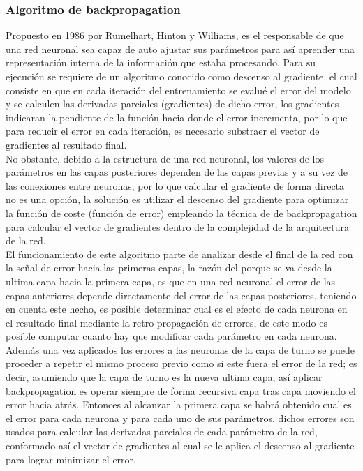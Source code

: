 \subsubsection{Algoritmo de backpropagation}
Propuesto en 1986 por  Rumelhart, Hinton y Williams, es el responsable de que una red neuronal sea capaz de auto ajustar sus parámetros para así aprender una representación interna de la información que estaba procesando. Para su ejecución se requiere de un algoritmo conocido como descenso al gradiente, el cual consiste en que en cada iteración del entrenamiento se evalué el error del modelo y se calculen las derivadas parciales (gradientes) de dicho error, los gradientes indicaran la pendiente de la función hacia donde el error incrementa, por lo que para reducir el error en cada iteración, es necesario substraer el vector de gradientes al resultado final. 
\\
No obstante, debido a la estructura de una red neuronal, los valores de los parámetros en las capas posteriores dependen de las capas previas y a su vez de las conexiones entre neuronas, por lo que calcular el gradiente de forma directa no es una opción, la solución es utilizar el descenso del gradiente para optimizar la función de coste (función de error) empleando la técnica de de backpropagation para calcular el vector de gradientes dentro de la complejidad de la arquitectura de la red. 
\\
El funcionamiento de este algoritmo parte de analizar desde el final de la red con la señal de error hacia las primeras capas, la razón del porque se va desde la ultima capa hacia la primera capa, es que en una red neuronal el error de las capas anteriores depende directamente del error de las capas posteriores, teniendo en cuenta este hecho, es posible determinar cual es el efecto de cada neurona en el resultado final mediante la retro propagación de errores, de este modo es posible computar cuanto hay que modificar cada parámetro en cada neurona. Además una vez aplicados los errores a las neuronas de la capa de turno se puede proceder a repetir el mismo proceso previo como si este fuera el error de la red; es decir, asumiendo que la capa de turno es la nueva ultima capa, así aplicar backpropagation es operar siempre de forma recursiva capa tras capa moviendo el error hacia atrás. Entonces al alcanzar la primera capa se habrá obtenido cual es el error para cada neurona y para cada uno de sus parámetros, dichos errores son usados para calcular las derivadas parciales de cada parámetro de la red, conformado así el vector de gradientes al cual se le aplica el descenso al gradiente para lograr minimizar el error. 
